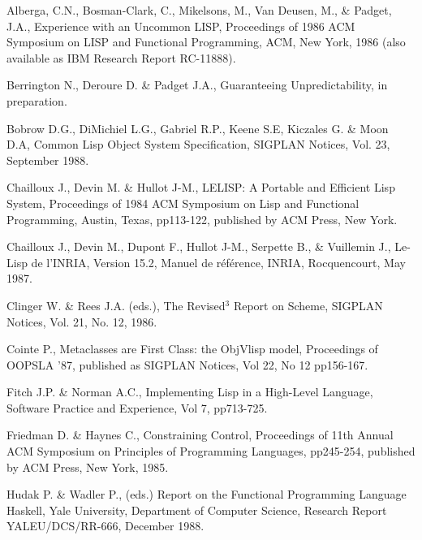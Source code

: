 \begin{optDefinition}
\bibannex
\begin{references}

    {Alberga, C.N., Bosman-Clark, C., Mikelsons, M., Van Deusen, M.,
     \& Padget, J.A.,}
    {Experience with an Uncommon LISP,}
    {Proceedings of 1986 ACM Symposium on LISP and Functional Programming, ACM,
     New York, 1986 (also available as IBM Research Report RC-11888).}
    \label{lisp/vm}

    {Berrington N., Deroure D. \& Padget J.A.,}
    {Guaranteeing Unpredictability,}
    {in preparation.}
    \label{lisp-processes}

    {Bobrow D.G., DiMichiel L.G., Gabriel R.P., Keene S.E, Kiczales G.
     \& Moon D.A,}
    {Common Lisp Object System Specification,}
    {SIGPLAN Notices, Vol. 23, September 1988.}
    \label{clos}

    {Chailloux J., Devin M. \& Hullot J-M.,}
    {LELISP: A Portable and Efficient Lisp System,}
    {Proceedings of 1984 ACM Symposium on Lisp and Functional Programming,
     Austin, Texas, pp113-122, published by ACM Press, New York.}
    \label{le-lisp}

    {Chailloux J., Devin M., Dupont F., Hullot J-M., Serpette B.,
     \& Vuillemin J.,}
    {Le-Lisp de l'INRIA, Version 15.2, Manuel de r\'ef\'erence,}
    {INRIA, Rocquencourt, May 1987.}
\label{lelisp-manual}

    {Clinger W. \& Rees J.A. (eds.),}
    {The Revised\/$^3$ Report on Scheme,}
    {SIGPLAN Notices, Vol. 21, No. 12, 1986.}
    \label{scheme-3}

    {Cointe P.,}
    {Metaclasses are First Class: the ObjVlisp model,}
    {Proceedings of OOPSLA '87, published as SIGPLAN Notices, Vol 22,
     No 12 pp156-167.}
    \label{objvlisp}

    {Fitch J.P. \& Norman A.C.,}
    {Implementing Lisp in a High-Level Language,}
    {Software Practice and Experience, Vol 7, pp713-725.}
    \label{cambridge-lisp}

    {Friedman D. \& Haynes C.,}
    {Constraining Control,}
    {Proceedings of 11th Annual ACM
     Symposium on Principles of Programming Languages, pp245-254,
     published by ACM Press, New York, 1985.}
    \label{constraining}

    {Hudak P. \& Wadler P., (eds.)}
    {Report on the Functional Programming Language Haskell,}
    {Yale University, Department of Computer Science, Research
     Report YALEU/DCS/RR-666, December 1988.}
    \label{haskell}


\end{references}
\end{optDefinition}

